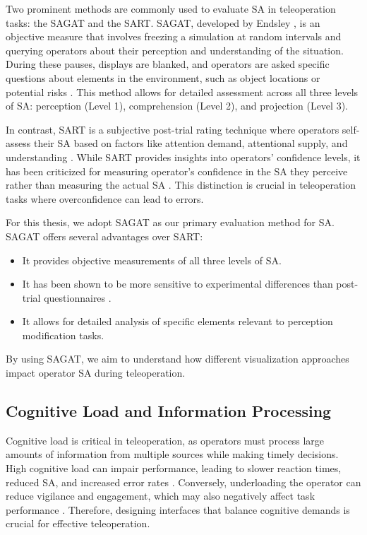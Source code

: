 Two prominent methods are commonly used to evaluate \ac{SA} in teleoperation tasks: the \ac{SAGAT} and the \ac{SART}. \ac{SAGAT}, developed by Endsley \cite{endsley1988sagat}, is an objective measure that involves freezing a simulation at random intervals and querying operators about their perception and understanding of the situation. During these pauses, displays are blanked, and operators are asked specific questions about elements in the environment, such as object locations or potential risks \cite{endsley2000direct}. This method allows for detailed assessment across all three levels of \ac{SA}: perception (Level 1), comprehension (Level 2), and projection (Level 3).

In contrast, \ac{SART} is a subjective post-trial rating technique where operators self-assess their \ac{SA} based on factors like attention demand, attentional supply, and understanding \cite{taylor1990sart}. While \ac{SART} provides insights into operators' confidence levels, it has been criticized for measuring operator's confidence in the \ac{SA} they perceive rather than measuring the actual \ac{SA} \cite{endsley2020review}. This distinction is crucial in teleoperation tasks where overconfidence can lead to errors.

For this thesis, we adopt \ac{SAGAT} as our primary evaluation method for \ac{SA}. \ac{SAGAT} offers several advantages over \ac{SART}:
\begin{itemize}
    \item It provides objective measurements of all three levels of \ac{SA}.
    \item It has been shown to be more sensitive to experimental differences than post-trial questionnaires \cite{endsley2000direct}.
    \item It allows for detailed analysis of specific elements relevant to perception modification tasks.
\end{itemize}
By using \ac{SAGAT}, we aim to understand how different visualization approaches impact operator \ac{SA} during teleoperation.

\subsection{Cognitive Load and Information Processing}\label{subsection:cognitiveload}
Cognitive load is critical in teleoperation, as operators must process large amounts of information from multiple sources while making timely decisions. High cognitive load can impair performance, leading to slower reaction times, reduced \ac{SA}, and increased error rates \cite{Kettwich}. Conversely, underloading the operator can reduce vigilance and engagement, which may also negatively affect task performance \cite{mutzenich2021updating}. Therefore, designing interfaces that balance cognitive demands is crucial for effective teleoperation.

